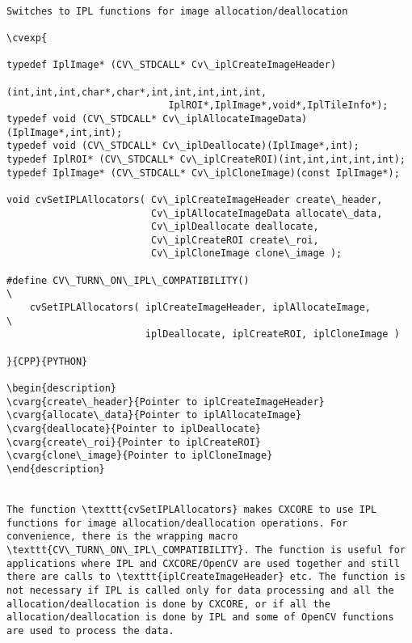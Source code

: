 \begin{verbatim}

Switches to IPL functions for image allocation/deallocation

\cvexp{

typedef IplImage* (CV\_STDCALL* Cv\_iplCreateImageHeader)
                            (int,int,int,char*,char*,int,int,int,int,int,
                            IplROI*,IplImage*,void*,IplTileInfo*);
typedef void (CV\_STDCALL* Cv\_iplAllocateImageData)(IplImage*,int,int);
typedef void (CV\_STDCALL* Cv\_iplDeallocate)(IplImage*,int);
typedef IplROI* (CV\_STDCALL* Cv\_iplCreateROI)(int,int,int,int,int);
typedef IplImage* (CV\_STDCALL* Cv\_iplCloneImage)(const IplImage*);

void cvSetIPLAllocators( Cv\_iplCreateImageHeader create\_header,
                         Cv\_iplAllocateImageData allocate\_data,
                         Cv\_iplDeallocate deallocate,
                         Cv\_iplCreateROI create\_roi,
                         Cv\_iplCloneImage clone\_image );

#define CV\_TURN\_ON\_IPL\_COMPATIBILITY()                                  \
    cvSetIPLAllocators( iplCreateImageHeader, iplAllocateImage,         \
                        iplDeallocate, iplCreateROI, iplCloneImage )

}{CPP}{PYTHON}

\begin{description}
\cvarg{create\_header}{Pointer to iplCreateImageHeader}
\cvarg{allocate\_data}{Pointer to iplAllocateImage}
\cvarg{deallocate}{Pointer to iplDeallocate}
\cvarg{create\_roi}{Pointer to iplCreateROI}
\cvarg{clone\_image}{Pointer to iplCloneImage}
\end{description}


The function \texttt{cvSetIPLAllocators} makes CXCORE to use IPL functions for image allocation/deallocation operations. For convenience, there is the wrapping macro \texttt{CV\_TURN\_ON\_IPL\_COMPATIBILITY}. The function is useful for applications where IPL and CXCORE/OpenCV are used together and still there are calls to \texttt{iplCreateImageHeader} etc. The function is not necessary if IPL is called only for data processing and all the allocation/deallocation is done by CXCORE, or if all the allocation/deallocation is done by IPL and some of OpenCV functions are used to process the data.
\end{verbatim}
